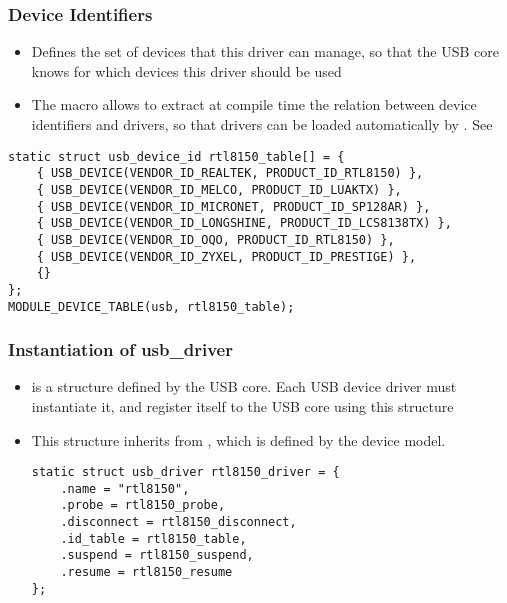 \begin{frame}[fragile]
  \frametitle{Device Identifiers}
  \begin{itemize}
  \item Defines the set of devices that this driver can manage, so
    that the USB core knows for which devices this driver should be
    used
  \item The  macro allows  to
    extract at compile time the relation between device identifiers
    and drivers, so that drivers can be loaded automatically by
    . See 
  \end{itemize}
  \begin{verbatim}
static struct usb_device_id rtl8150_table[] = {
    { USB_DEVICE(VENDOR_ID_REALTEK, PRODUCT_ID_RTL8150) },
    { USB_DEVICE(VENDOR_ID_MELCO, PRODUCT_ID_LUAKTX) },
    { USB_DEVICE(VENDOR_ID_MICRONET, PRODUCT_ID_SP128AR) },
    { USB_DEVICE(VENDOR_ID_LONGSHINE, PRODUCT_ID_LCS8138TX) },
    { USB_DEVICE(VENDOR_ID_OQO, PRODUCT_ID_RTL8150) },
    { USB_DEVICE(VENDOR_ID_ZYXEL, PRODUCT_ID_PRESTIGE) },
    {}
};
MODULE_DEVICE_TABLE(usb, rtl8150_table);
  \end{verbatim}
\end{frame}

\begin{frame}[fragile]
  \frametitle{Instantiation of usb\_driver}
  \begin{itemize}
  \item {} is a structure defined by the USB
    core. Each USB device driver must instantiate it, and register
    itself to the USB core using this structure
  \item This structure inherits from , which is defined
    by the device model.
  \begin{verbatim}
static struct usb_driver rtl8150_driver = {
    .name = "rtl8150",
    .probe = rtl8150_probe,
    .disconnect = rtl8150_disconnect,
    .id_table = rtl8150_table,
    .suspend = rtl8150_suspend,
    .resume = rtl8150_resume
};
  \end{verbatim}
  \end{itemize}
\end{frame}

